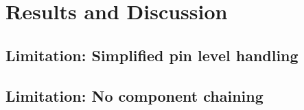 
\chapter{Results and Discussion} \label{chapter:results}

\section{Limitation: Simplified pin level handling}


\section{Limitation: No component chaining}

